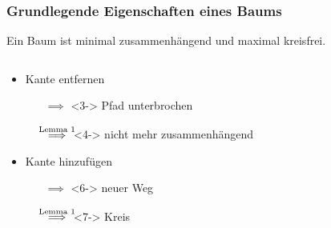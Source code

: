 \begin{frame}[t]
\frametitle{Grundlegende Eigenschaften eines Baums}
\begin{lemma}
        Ein Baum ist minimal zusammenhängend und maximal kreisfrei.
\end{lemma}
%
\begin{columns}
    \begin{column}{0.58\textwidth}
        \begin{itemize}
            \item<2-> Kante entfernen 
            \begin{itemize}
                \item[$\implies$]<3-> Pfad unterbrochen 
                \item[$\overset{\mathclap{\text{Lemma 1}}}{\implies}$]<4-> nicht mehr zusammenhängend
            \end{itemize}
            \item<5-> Kante hinzufügen 
            \begin{itemize}
                \item[$\implies$]<6-> neuer Weg 
                \item[$\overset{\mathclap{\text{Lemma 1}}}{\implies}$]<7-> Kreis
            \end{itemize}
        \end{itemize}
    \end{column}
    \begin{column}{0.25\textwidth}
         {
        \begin{figure}
        \end{figure}
        }


\end{column}
\end{columns}
\end{frame}
